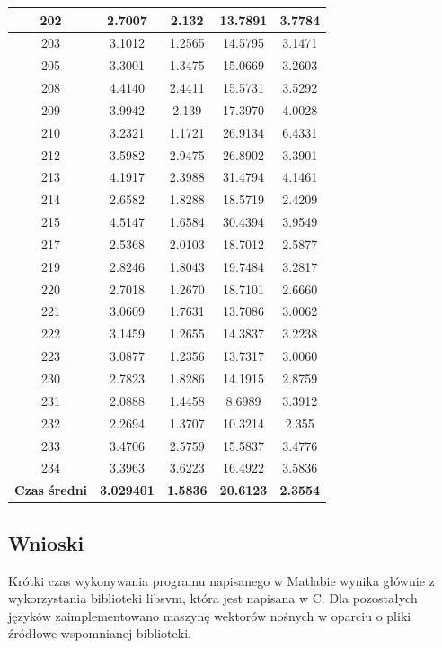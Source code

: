 \begin{table}[!tp]
\begin{tabular}{|c|c|c|c|c|}
		202 & 2.7007 & 2.132  & 13.7891 & 3.7784\\ \hline
		203 & 3.1012 & 1.2565 & 14.5795 & 3.1471\\ \hline
		205 & 3.3001 & 1.3475 & 15.0669 & 3.2603\\ \hline
		208 & 4.4140 & 2.4411 & 15.5731 & 3.5292\\ \hline
		209 & 3.9942 & 2.139  & 17.3970 & 4.0028\\ \hline	
		210 & 3.2321 & 1.1721 & 26.9134 & 6.4331\\ \hline
		212 & 3.5982 & 2.9475 & 26.8902 & 3.3901\\ \hline
		213 & 4.1917 & 2.3988 & 31.4794 & 4.1461\\ \hline
		214 & 2.6582 & 1.8288 & 18.5719 & 2.4209\\ \hline
		215 & 4.5147 & 1.6584 & 30.4394 & 3.9549\\ \hline
		217 & 2.5368 & 2.0103 & 18.7012 & 2.5877\\ \hline
		219 & 2.8246 & 1.8043 & 19.7484 & 3.2817\\ \hline
		220 & 2.7018 & 1.2670 & 18.7101 & 2.6660\\ \hline		
		221 & 3.0609 & 1.7631 & 13.7086 & 3.0062\\ \hline
		222 & 3.1459 & 1.2655 & 14.3837 & 3.2238\\ \hline
		223 & 3.0877 & 1.2356 & 13.7317 & 3.0060\\ \hline
		230 & 2.7823 & 1.8286 & 14.1915 & 2.8759\\ \hline
		231 & 2.0888 & 1.4458 &  8.6989 & 3.3912\\ \hline
		232 & 2.2694 & 1.3707 & 10.3214  & 2.355\\ \hline
		233 & 3.4706 & 2.5759 & 15.5837 & 3.4776\\ \hline
		234 & 3.3963 & 3.6223 & 16.4922 & 3.5836\\ \hline
		\textbf{Czas średni} & \textbf{3.029401} & \textbf{1.5836} & \textbf{20.6123} & \textbf{2.3554}\\ \hline
	\end{tabular}
\end{table}

\subsection{Wnioski}

\qquad Krótki czas wykonywania programu napisanego w Matlabie wynika głównie z wykorzystania biblioteki libsvm, która jest napisana w C. Dla pozostałych języków zaimplementowano maszynę wektorów nośnych w oparciu o pliki źródłowe wspomnianej biblioteki.

